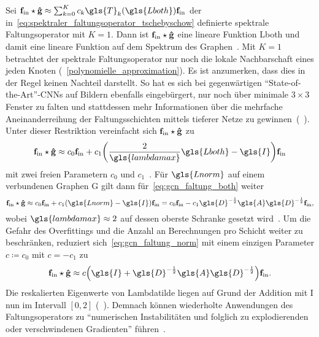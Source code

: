Sei $\ve{f}_{\mathrm{in}} \star \ve{\hat g} \approx \sum_{k=0}^K c_k \gls{T}_k\left(\gls{Lboth}\right) \ve{f}_{\mathrm{in}}$ der in~\eqref{eq:spektraler_faltungsoperator_tschebyschow} definierte spektrale Faltungsoperator mit $K=1$.
Dann ist $\mathbf{f}_{\mathrm{in}} \star \mathbf{\hat g}$ eine lineare Funktion \bzgl{} \gls{Lboth} und damit eine lineare Funktion auf dem Spektrum des Graphen~\cite{gcn}.
Mit $K=1$ betrachtet der spektrale Faltungsoperator nur noch die lokale Nachbarschaft eines jeden Knoten (\vgl{}~\ref{polynomielle_approximation}).
Es ist anzumerken, dass dies in der Regel keinen Nachteil darstellt.
So hat es sich bei gegenwärtigen \enquote{State-of-the-Art}-\glspl{CNN} auf Bildern ebenfalls eingebürgert, nur noch über minimale $3\times3$ Fenster zu falten und stattdessen mehr Informationen über die mehrfache Aneinanderreihung der Faltungsschichten mittels tieferer Netze zu gewinnen~(\vgl{}~\cite{gcn, vgg, He}).
Unter dieser Restriktion vereinfacht sich $\mathbf{f}_{\mathrm{in}} \star \mathbf{\hat g}$ zu
\begin{equation}
  \ve{f}_{\mathrm{in}} \star \ve{\hat g} \approx c_0 \ve{f}_{\mathrm{in}} + c_1 \left(\frac{2}{\gls{lambdamax}}\gls{Lboth} - \gls{I}\right)\ve{f}_{\mathrm{in}}
  \label{eq:gcn_faltung_both}
\end{equation}
mit zwei freien Parametern $c_0$ und $c_1$~\cite{gcn}.
Für $\gls{Lnorm}$ auf einem verbundenen Graphen \gls{G} gilt dann für~\eqref{eq:gcn_faltung_both} weiter
\begin{equation}
  \ve{f}_{\mathrm{in}} \star \ve{\hat g} \approx c_0 \ve{f}_{\mathrm{in}} + c_1 \left(\gls{Lnorm} - \gls{I}\right)\ve{f}_{\mathrm{in}} = c_0 \ve{f}_{\mathrm{in}} - c_1 \gls{D}^{-\frac{1}{2}} \gls{A} \gls{D}^{-\frac{1}{2}} \ve{f}_{\mathrm{in}},
  \label{eq:gcn_faltung_norm}
\end{equation}
wobei $\gls{lambdamax} \approx 2$ auf dessen oberste Schranke gesetzt wird~\cite{gcn}.
Um die Gefahr des Overfittings und die Anzahl an Berechnungen pro Schicht weiter zu beschränken, reduziert sich~\eqref{eq:gcn_faltung_norm} mit einem einzigen Parameter $c \coloneqq c_0$ mit $c = -c_1$ zu~\cite{gcn}
\begin{equation*}
  \ve{f}_{\mathrm{in}} \star \ve{\hat g} \approx c \left(\gls{I} + \gls{D}^{-\frac{1}{2}} \gls{A} \gls{D}^{-\frac{1}{2}} \right) \ve{f}_{\mathrm{in}}.
\end{equation*}
Die reskalierten Eigenwerte von \gls{Lambdatilde} liegen auf Grund der Addition mit \gls{I} nun im Intervall $\left[0, 2\right]$ (\vgl{}~\cite{gcn}).
Demnach können wiederholte Anwendungen des Faltungsoperators zu \enquote{numerischen Instabilitäten und folglich zu explodierenden oder verschwindenen Gradienten} führen~\cite{gcn}.
